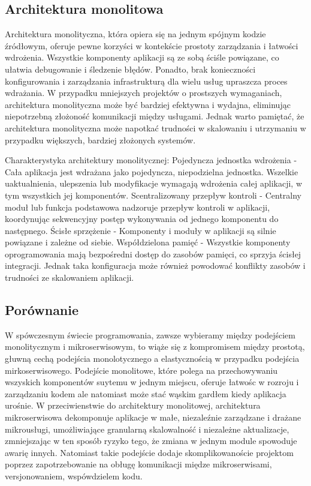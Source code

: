 \documentclass[runningheads,12pt]{llncs} \usepackage{graphicx} \usepackage{todonotes} \usepackage{fancyhdr} \usepackage{lipsum} \usepackage[T1]{fontenc} \usepackage[provide=*,english,polish]{babel}
\begin{document}
\subsection{Architektura monolitowa}

Architektura monolityczna, która opiera się na jednym spójnym kodzie źródłowym, oferuje pewne korzyści w kontekście prostoty zarządzania i łatwości wdrożenia. Wszystkie komponenty aplikacji są ze sobą ściśle powiązane, co ułatwia debugowanie i śledzenie błędów. Ponadto, brak konieczności konfigurowania i zarządzania infrastrukturą dla wielu usług upraszcza proces wdrażania. W przypadku mniejszych projektów o prostszych wymaganiach, architektura monolityczna może być bardziej efektywna i wydajna, eliminując niepotrzebną złożoność komunikacji między usługami. Jednak warto pamiętać, że architektura monolityczna może napotkać trudności w skalowaniu i utrzymaniu w przypadku większych, bardziej złożonych systemów.

Charakterystyka architektury monolitycznej: 
Pojedyncza jednostka wdrożenia - Cała aplikacja jest wdrażana jako pojedyncza, niepodzielna jednostka. Wszelkie uaktualnienia, ulepszenia lub modyfikacje wymagają wdrożenia całej aplikacji, w tym wszystkich jej komponentów.
Scentralizowany przepływ kontroli - Centralny moduł lub funkcja podstawowa nadzoruje przepływ kontroli w aplikacji, koordynując sekwencyjny postęp wykonywania od jednego komponentu do następnego.
Ścisłe sprzężenie - Komponenty i moduły w aplikacji są silnie powiązane i zależne od siebie.
Współdzielona pamięć - Wszystkie komponenty oprogramowania mają bezpośredni dostęp do zasobów pamięci, co sprzyja ścisłej integracji. Jednak taka konfiguracja może również powodować konflikty zasobów i trudności ze skalowaniem aplikacji.~\cite{sharma2023monolithic}
\subsection{Porównanie}

W spówczesnym świecie programowania, zawsze wybieramy między podejściem monolitycznym i mikroserwisowym, to wiąże się z kompromisem między prostotą, głuwną cechą podejścia monolotycznego a elastycznością w przypadku podejścia mirkoserwisowego. Podejście monolitowe, które polega na przechowywaniu wszyskich komponentów suytemu w jednym miejscu, oferuje łatwośc w rozroju i zarządzaniu kodem ale natomiast może stać wąskim gardłem kiedy aplikacja urośnie. W przeciwienstwie do architektury monolitowej, architektura mikroserwisowa dekomponuje aplikacje w małe, niezaleźnie zarządzane i drażane mikrousługi, umożliwiające granularną skalowalność i niezależne aktualizacje, zmniejszając w ten sposób ryzyko tego, że zmiana w jednym module spowoduje awarię innych. Natomiast takie podejście dodaje skomplikowanoście projektom poprzez zapotrzebowanie na obługę komunikacji międze mikroserwisami, versjonowaniem, wspówdzielem kodu. 
\end{document}
